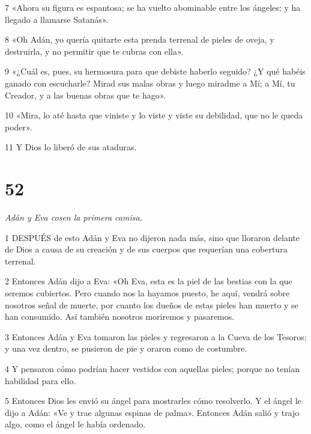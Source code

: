 \par 7 «Ahora su figura es espantosa; se ha vuelto abominable entre los ángeles; y ha llegado a llamarse Satanás».

\par 8 «Oh Adán, yo quería quitarte esta prenda terrenal de pieles de oveja, y destruirla, y no permitir que te cubras con ella».

\par 9 «¿Cuál es, pues, su hermosura para que debiste haberlo seguido? ¿Y qué habéis ganado con escucharle? Mirad sus malas obras y luego miradme a Mí; a Mí, tu Creador, y a las buenas obras que te hago».

\par 10 «Mira, lo até hasta que viniste y lo viste y viste su debilidad, que no le queda poder».

\par 11 Y Dios lo liberó de sus ataduras.

\chapter{52}

\par \textit{Adán y Eva cosen la primera camisa.}

\par 1 DESPUÉS de esto Adán y Eva no dijeron nada más, sino que lloraron delante de Dios a causa de su creación y de sus cuerpos que requerían una cobertura terrenal.

\par 2 Entonces Adán dijo a Eva: «Oh Eva, esta es la piel de las bestias con la que seremos cubiertos. Pero cuando nos la hayamos puesto, he aquí, vendrá sobre nosotros señal de muerte, por cuanto los dueños de estas pieles han muerto y se han consumido. Así también nosotros moriremos y pasaremos.

\par 3 Entonces Adán y Eva tomaron las pieles y regresaron a la Cueva de los Tesoros; y una vez dentro, se pusieron de pie y oraron como de costumbre.

\par 4 Y pensaron cómo podrían hacer vestidos con aquellas pieles; porque no tenían habilidad para ello.

\par 5 Entonces Dios les envió su ángel para mostrarles cómo resolverlo. Y el ángel le dijo a Adán: «Ve y trae algunas espinas de palma». Entonces Adán salió y trajo algo, como el ángel le había ordenado.

